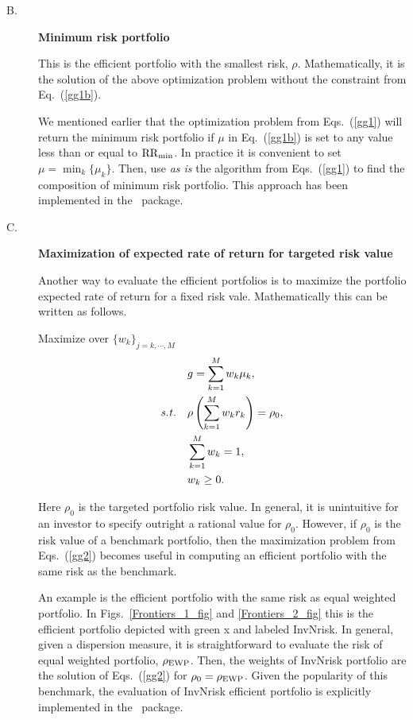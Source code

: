 \begin{description}
  \item[B.\label{MinRisk}] {\bf Minimum risk portfolio}

    This is the efficient portfolio with the smallest risk, $\rho$.
    Mathematically, it is the solution of the above optimization problem without the constraint from Eq.~(\ref{gg1b}).

    We mentioned earlier that the optimization problem from Eqs.~(\ref{gg1}) will return the
    minimum risk portfolio if $\mu$ in Eq.~(\ref{gg1b}) is set to any value less than or equal to ${\rm RR}_{\min}$.
    In practice it is convenient to set $\mu=\min_k\{\mu_k\}$. Then, use {\it as is} the algorithm from Eqs.~(\ref{gg1}) to
    find the composition of minimum risk portfolio.
    This approach has been implemented in the \azapy\ package.

  \item[C.\label{TargetRisk}] {\bf Maximization of expected rate of return for targeted risk value}

    Another way to evaluate the efficient portfolios is to maximize the portfolio expected rate of return
    for a fixed risk vale. Mathematically this can be written as follows.

    \bigskip
    \noindent Maximize over $\{w_k\}_{j=k,\cdots,M}$
    \begin{subequations}\label{gg2}
    \begin{align}
        & g =  \sum_{k=1}^M w_k \mu_k, \label{gg2a} \\
        \st & \rho\left(\sum_{k=1}^M w_k r_k \right) = \rho_0, \label{gg2b} \\
            & \sum_{k=1}^M w_k = 1, \label{gg2c} \\
            & w_k \ge 0. \label{gg2d}
    \end{align}
    \end{subequations}

    \noindent Here $\rho_0$ is the targeted portfolio risk value.
    In general, it is unintuitive for an investor to specify outright a rational value for $\rho_0$.
    However, if $\rho_0$ is the risk value of a benchmark portfolio, then the maximization problem
    from Eqs.~(\ref{gg2}) becomes useful in computing an efficient portfolio with the same risk as the benchmark.

    An example is the efficient portfolio with the same risk as equal weighted portfolio.
    In Figs.~\ref{Frontiers_1_fig} and \ref{Frontiers_2_fig} this is the efficient portfolio depicted with green x and labeled InvNrisk.
    In general, given a dispersion measure, it is straightforward to evaluate the risk of equal weighted portfolio, $\rho_{\rm EWP}$.
    Then, the weights of InvNrisk portfolio are the solution of Eqs.~(\ref{gg2})
    for $\rho_0 = \rho_{\rm EWP}$. Given the popularity of this benchmark,
    the evaluation of InvNrisk efficient portfolio is explicitly implemented in the \azapy\ package.


\end{description}
